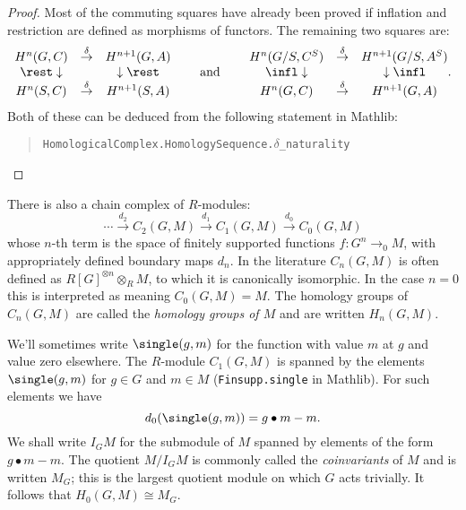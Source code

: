 \begin{proof}
	Most of the commuting squares have already been proved if
	inflation and restriction are defined as morphisms of functors.
	The remaining two squares are:
	\[
  	\begin{matrix}
			H^n(G,C)& \stackrel{\delta}\to& H^{n+1}(G,A)\\
			\rest\downarrow&&\downarrow\rest \\
			H^n(S,C)& \stackrel{\delta} \to& H^{n+1}(S,A)
		\end{matrix}
		\qquad\textrm{ and }\qquad
		\begin{matrix}
			H^n(G/S,C^S)& \stackrel{\delta}\to& H^{n+1}(G/S,A^S)\\
			\infl\downarrow&&\downarrow\infl\\
			H^n(G,C)& \stackrel{\delta}\to& H^{n+1}(G,A)
		\end{matrix} .
  \]
	Both of these can be deduced from the following statement in Mathlib:
	\begin{quote}
		\texttt{HomologicalComplex.HomologySequence.$\delta$\_naturality}
	\end{quote}
\end{proof}

\begin{definition} \label{def:group homology}
	\mathlibok
	There is also a chain complex of $R$-modules:
	\[
		\cdots \stackrel{d_2}\to C_2(G,M) \stackrel{d_1}\to C_1(G,M) \stackrel{d_0}\to C_0(G,M)
	\]
	whose $n$-th term is the space of finitely supported functions
	$f : G^n \to_0 M$, with appropriately defined boundary maps $d_n$.
	In the literature $C_n(G,M)$ is often defined as $R[G]^{\otimes n} \otimes_R M$, to which it is
	canonically isomorphic.
	In the case $n=0$ this is interpreted as meaning $C_0(G,M) = M$.
	The homology groups of $C_n(G,M)$ are called the \emph{homology groups of $M$}
	and are written $H_n(G,M)$.
\end{definition}

\begin{example} \label{eg:homology 0}
	We'll sometimes write $\single(g,m)$ for the function with value $m$ at $g$ and value
	zero elsewhere. The $R$-module $C_1(G,M)$ is spanned by the elements $\single(g,m)$
	for $g \in G$ and $m \in M$ (\texttt{Finsupp.single} in Mathlib).
	For such elements we have
	\[
		d_0(\single(g,m))
		=
		g \bullet m - m.
	\]
	We shall write $I_G M$ for the submodule of $M$ spanned by elements of the form $g \bullet m - m$.
	The quotient $M / I_GM$ is commonly called the \emph{coinvariants} of $M$ and is written $M_G$;
	this is the largest	quotient module on which $G$ acts trivially.
	It follows that $H_0(G,M) \cong M_G$.
\end{example}

